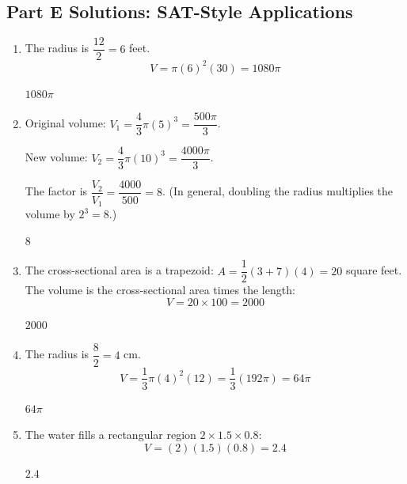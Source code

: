 \documentclass[14pt]{extarticle}
\begin{document}
\subsection*{Part E Solutions: SAT-Style Applications}
\begin{enumerate}
  \item The radius is \(\dfrac{12}{2} = 6\) feet.
  \[
  V = \pi(6)^2(30) = 1080\pi
  \]

  \(\boxed{1080\pi}\)

  \item Original volume: \(V_1 = \dfrac{4}{3}\pi(5)^3 = \dfrac{500\pi}{3}\).

  New volume: \(V_2 = \dfrac{4}{3}\pi(10)^3 = \dfrac{4000\pi}{3}\).

  The factor is \(\dfrac{V_2}{V_1} = \dfrac{4000}{500} = 8\). (In general, doubling the radius multiplies the volume by \(2^3 = 8\).)

  \(\boxed{8}\)

  \item The cross-sectional area is a trapezoid: \(A = \dfrac{1}{2}(3 + 7)(4) = 20\) square feet. The volume is the cross-sectional area times the length:
  \[
  V = 20 \times 100 = 2000
  \]

  \(\boxed{2000}\)

  \item The radius is \(\dfrac{8}{2} = 4\) cm.
  \[
  V = \frac{1}{3}\pi(4)^2(12) = \frac{1}{3}(192\pi) = 64\pi
  \]

  \(\boxed{64\pi}\)

  \item The water fills a rectangular region \(2 \times 1.5 \times 0.8\):
  \[
  V = (2)(1.5)(0.8) = 2.4
  \]

  \(\boxed{2.4}\)
\end{enumerate}

\end{document}
